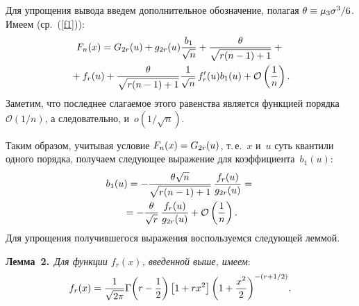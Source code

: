 \begin{multicols}{2}
Для упрощения вывода введем дополнительное обозначение, 
полагая $\theta \hm\equiv \mu_3 \sigma^{3}/6$. Имеем (ср.~(\ref{f1})):
\begin{multline*}
F_n(x)
   = G_{2r}(u)+g_{2r}(u) \fr{b_1}{\sqrt{n}}+
   \fr{\theta}{\sqrt{r(n-1)+1}} +{}\\
   {}+ f_r(u) + \fr{\theta}{\sqrt{r(n-1)+1}} \fr{1}{\sqrt{n}}\, f_{r}'(u) b_1(u) + 
\mathcal{O}\left(\fr{1}{n}\right) .
\end{multline*}
Заметим, что последнее слагаемое этого равенства является функцией 
порядка  $\mathcal{O}\left(1/n\right)$, а следовательно, 
и~$o\left(1/\sqrt{n}\right)$.

Таким образом, учитывая условие $F_n(x)\hm=G_{2r}(u)$, т.\,е.~$x$ и~$u$ 
суть квантили одного порядка, получаем следующее выражение для коэффициента~$b_1(u)$:
\begin{multline*}
 b_1(u)  =-\fr{\theta \sqrt{n}}{\sqrt{r(n-1)+1}}\,\fr{f_r(u)}{g_{2r}(u)}
     ={}\\
     {}= -\fr{\theta}{\sqrt{r}}\,\fr{f_r(u)}{g_{2r}(u)}+
     \mathcal{O}\left(\fr{1}{n}\right).
\end{multline*}
Для упрощения получившегося выражения воспользуемся следующей леммой.

\smallskip

\noindent
\textbf{Лемма~2.}\
\textit{Для функции $f_r(x)$, введенной выше, имеем}:
$$ 
f_r(x)=\fr{1}{\sqrt{2\pi}}\Gamma\!\left(r-\fr{1}{2}\right) \left[ 
1+rx^{2}\right] \left(1+\fr{x^{2}}{2} \right)^{-\left( r+1/2 \right)}\! .
$$




\end{multicols}
